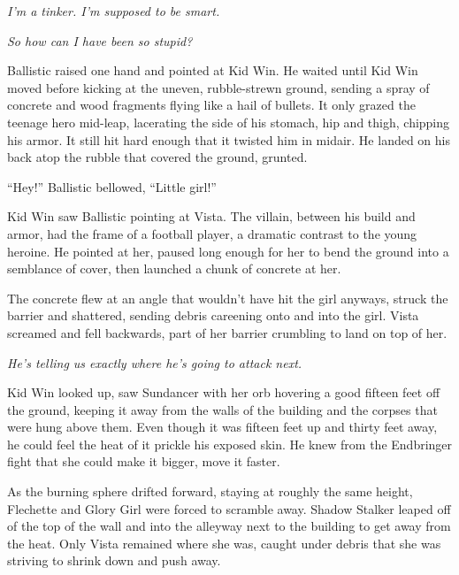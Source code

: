 





\emph{I'm a tinker.  I'm supposed to be smart.}



\emph{So how can I have been so stupid?}



Ballistic raised one hand and pointed at Kid Win.  He waited until Kid Win moved before kicking at the uneven, rubble-strewn ground, sending a spray of concrete and wood fragments flying like a hail of bullets.  It only grazed the teenage hero mid-leap, lacerating the side of his stomach, hip and thigh, chipping his armor.  It still hit hard enough that it twisted him in midair.  He landed on his back atop the rubble that covered the ground, grunted.



``Hey!'' Ballistic bellowed, ``Little girl!''



Kid Win saw Ballistic pointing at Vista.  The villain, between his build and armor, had the frame of a football player, a dramatic contrast to the young heroine.  He pointed at her, paused long enough for her to bend the ground into a semblance of cover, then launched a chunk of concrete at her.



The concrete flew at an angle that wouldn't have hit the girl anyways, struck the barrier and shattered, sending debris careening onto and into the girl.  Vista screamed and fell backwards, part of her barrier crumbling to land on top of her.



\emph{He's telling us exactly where he's going to attack next.}



Kid Win looked up, saw Sundancer with her orb hovering a good fifteen feet off the ground, keeping it away from the walls of the building and the corpses that were hung above them.  Even though it was fifteen feet up and thirty feet away, he could feel the heat of it prickle his exposed skin.  He knew from the Endbringer fight that she could make it bigger, move it faster.



As the burning sphere drifted forward, staying at roughly the same height, Flechette and Glory Girl were forced to scramble away.  Shadow Stalker leaped off of the top of the wall and into the alleyway next to the building to get away from the heat.  Only Vista remained where she was, caught under debris that she was striving to shrink down and push away.



